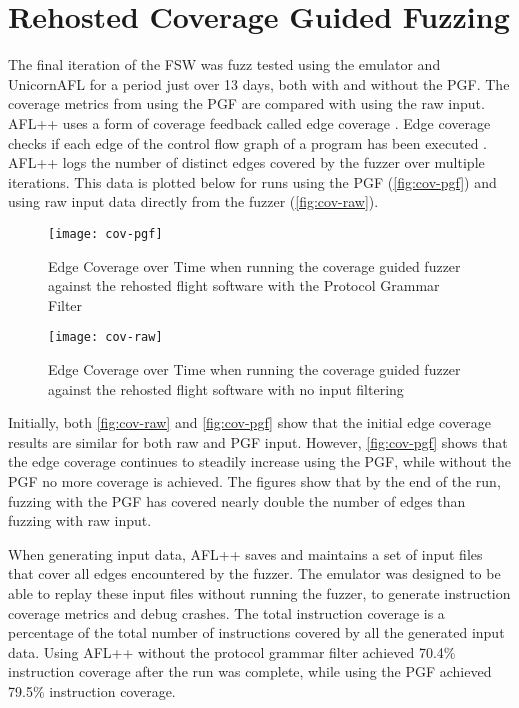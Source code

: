 \documentclass[../report.tex]{subfiles}
\begin{document}
\section{Rehosted Coverage Guided Fuzzing}

The final iteration of the FSW was fuzz tested using the emulator and
UnicornAFL for a period just over 13 days, both with and without the PGF. The
coverage metrics from using the PGF are compared with using the raw input.
AFL++ uses a form of coverage feedback called edge coverage
\citep{AFLplusplus}. Edge coverage checks if each edge of the control flow
graph of a program has been executed \citep{edgecoverage}. AFL++ logs the
number of distinct edges covered by the fuzzer over multiple iterations. This
data is plotted below for runs using the PGF (\autoref{fig:cov-pgf}) and using
raw input data directly from the fuzzer (\autoref{fig:cov-raw}).

\begin{figure}[H]
    \centering
    \texttt{[image: cov-pgf]}
    \caption{Edge Coverage over Time when running the coverage guided fuzzer
    against the rehosted flight software with the Protocol Grammar Filter}
    \label{fig:cov-pgf}
\end{figure}

\begin{figure}[H]
    \centering
    \texttt{[image: cov-raw]}
    \caption{Edge Coverage over Time when running the coverage guided fuzzer
    against the rehosted flight software with no input filtering}
    \label{fig:cov-raw}
\end{figure}

Initially, both \autoref{fig:cov-raw} and \autoref{fig:cov-pgf} show that the
initial edge coverage results are similar for both raw and PGF input. However,
\autoref{fig:cov-pgf} shows that the edge coverage continues to steadily
increase using the PGF, while without the PGF no more coverage is achieved. The
figures show that by the end of the run, fuzzing with the PGF has covered
nearly double the number of edges than fuzzing with raw input.

When generating input data, AFL++ saves and maintains a set of input files that
cover all edges encountered by the fuzzer. The emulator was designed to be able
to replay these input files without running the fuzzer, to generate instruction
coverage metrics and debug crashes. The total instruction coverage is a
percentage of the total number of instructions covered by all the generated
input data. Using AFL++ without the protocol grammar filter achieved 70.4\%
instruction coverage after the run was complete, while using the PGF achieved
79.5\% instruction coverage.
\end{document}
